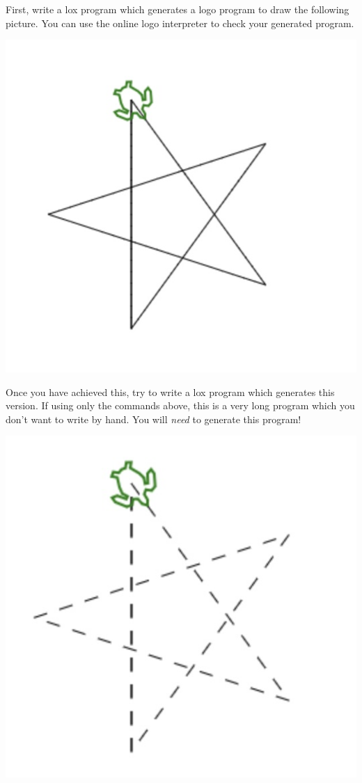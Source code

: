 \documentclass[twoside=false, DIV=14]{scrartcl}
\begin{document}
First, write a lox program which generates a logo program to draw the following picture.  You can use the online logo interpreter to check your generated program.

\includegraphics{first.jpg}

Once you have achieved this, try to write a lox program which generates this version.  If using only the commands above, this is a very long program which you don't want to write by hand.  You will \emph{need} to generate this program!

\includegraphics{second.jpg}
\end{document}
